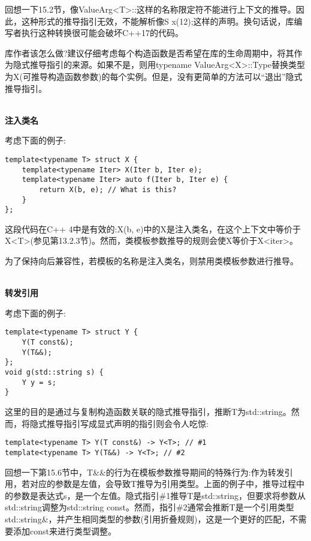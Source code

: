 回想一下15.2节，像ValueArg<T>::这样的名称限定符不能进行上下文的推导。因此，这种形式的推导指引无效，不能解析像S x(12);这样的声明。换句话说，库编写者执行这种转换很可能会破坏C++17的代码。

库作者该怎么做?建议仔细考虑每个构造函数是否希望在库的生命周期中，将其作为隐式推导指引的来源。如果不是，则用typename ValueArg<X>::Type替换类型为X(可推导构造函数参数)的每个实例。但是，没有更简单的方法可以“退出”隐式推导指引。


\hspace*{\fill} \\ %
\noindent
\textbf{注入类名}

考虑下面的例子:

\begin{lstlisting}[style=styleCXX]
template<typename T> struct X {
	template<typename Iter> X(Iter b, Iter e);
	template<typename Iter> auto f(Iter b, Iter e) {
		return X(b, e); // What is this?
	}
};
\end{lstlisting}

这段代码在C++ 4中是有效的:X(b, e)中的X是注入类名，在这个上下文中等价于X<T>(参见第13.2.3节)。然而，类模板参数推导的规则会使X等价于X<iter>。

为了保持向后兼容性，若模板的名称是注入类名，则禁用类模板参数进行推导。


\hspace*{\fill} \\ %
\noindent
\textbf{转发引用}

考虑下面的例子:

\begin{lstlisting}[style=styleCXX]
template<typename T> struct Y {
	Y(T const&);
	Y(T&&);
};
void g(std::string s) {
	Y y = s;
}
\end{lstlisting}

这里的目的是通过与复制构造函数关联的隐式推导指引，推断T为std::string。然而，将隐式推导指引写成显式声明的指引则会令人吃惊:

\begin{lstlisting}[style=styleCXX]
template<typename T> Y(T const&) -> Y<T>; // #1
template<typename T> Y(T&&) -> Y<T>; // #2
\end{lstlisting}

回想一下第15.6节中，T\&\&的行为在模板参数推导期间的特殊行为:作为转发引用，若对应的参数是左值，会导致T推导为引用类型。上面的例子中，推导过程中的参数是表达式s，是一个左值。隐式指引\#1推导T是std::string，但要求将参数从std::string调整为std::string const。然而，指引\#2通常会推断T是一个引用类型std::string\&，并产生相同类型的参数(引用折叠规则)，这是一个更好的匹配，不需要添加const来进行类型调整。

